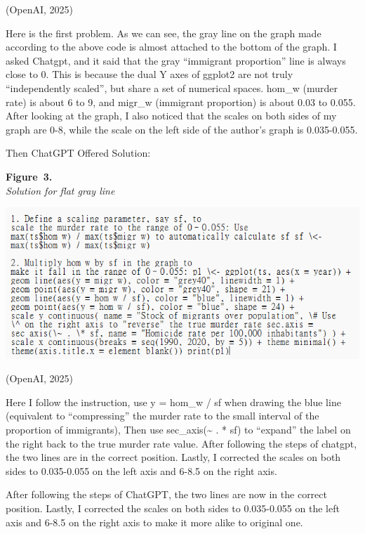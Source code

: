\documentclass[
  jou,
  floatsintext,
  longtable,
  nolmodern,
  notxfonts,
  notimes,
  colorlinks=true,linkcolor=blue,citecolor=blue,urlcolor=blue]{apa7}
\begin{document}
(OpenAI, 2025)

Here is the first problem. As we can see, the gray line on the graph
made according to the above code is almost attached to the bottom of the
graph. I asked Chatgpt, and it said that the gray ``immigrant
proportion'' line is always close to 0. This is because the dual Y axes
of ggplot2 are not truly ``independently scaled'', but share a set of
numerical spaces. hom\_w (murder rate) is about 6 to 9, and migr\_w
(immigrant proportion) is about 0.03 to 0.055. After looking at the
graph, I also noticed that the scales on both sides of my graph are 0-8,
while the scale on the left side of the author's graph is 0.035-0.055.

Then ChatGPT Offered Solution:

\label{fig:S2}
\textbf{Figure~3.}\\
\emph{Solution for flat gray line}

\begin{center}
\includegraphics[width=0.8\linewidth,height=\textheight,keepaspectratio]{fig/S2.png}
\end{center}

(OpenAI, 2025)

Here I follow the instruction, use y = hom\_w / sf when drawing the blue
line (equivalent to ``compressing'' the murder rate to the small
interval of the proportion of immigrants), Then use
sec\_axis(\textasciitilde{} . * sf) to ``expand'' the label on the right
back to the true murder rate value. After following the steps of
chatgpt, the two lines are in the correct position. Lastly, I corrected
the scales on both sides to 0.035-0.055 on the left axis and 6-8.5 on
the right axis.

After following the steps of ChatGPT, the two lines are now in the
correct position. Lastly, I corrected the scales on both sides to
0.035-0.055 on the left axis and 6-8.5 on the right axis to make it more
alike to original one.
\end{document}

